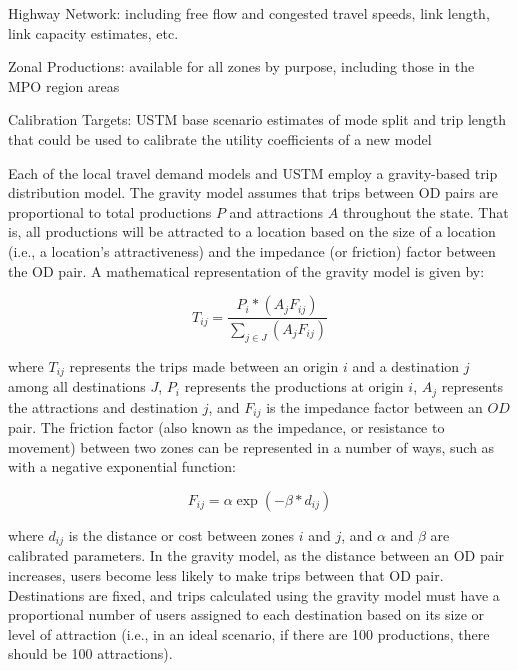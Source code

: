 \begin{description}
\def\labelenumi{\arabic{enumi}.}
\item
  {Highway Network}: including free flow and congested travel speeds,
  link length, link capacity estimates, etc.
\item
  {Zonal Productions}: available for all zones by purpose,
  including those in the MPO region areas
\item
  {Calibration Targets}: USTM base scenario estimates of mode split and
  trip length that could be used to calibrate the utility coefficients of a new model
\end{description}

Each of the local travel demand models and USTM employ a gravity-based trip
distribution model. The gravity model assumes that trips between OD
pairs are proportional to total productions $P$ and
attractions $A$ throughout the state. That is, all productions will be
attracted to a location based on the size of a location (i.e., a location's
attractiveness) and the impedance (or friction) factor between the OD
pair. A mathematical representation of the gravity model is given by:

\begin{equation}
T_{ij}= \frac{P_i*(A_j F_{ij})}{\sum_{j\in J}(A_j F_{ij})}
 \label{eqn:gravity}
\end{equation}

\noindent where $T_{ij}$ represents the trips made between an origin $i$ and a
  destination $j$ among all destinations $J$, $P_i$ represents the productions at origin $i$, $A_j$ represents the attractions and destination $j$, and $F_{ij}$ is the impedance factor between an $OD$ pair.
The friction factor (also known as the impedance, or resistance to movement) between two
zones can be represented in a number of ways, such as with a negative
exponential function:

\begin{equation}
	F_{ij} = \alpha \exp(-\beta * d_{ij})
  \label{eqn:fricfac}
\end{equation}

\noindent where $d_{ij}$ is the distance or cost between zones $i$ and $j$, and $\alpha$
and $\beta$ are calibrated parameters. In the gravity model, as the distance
between an OD pair increases, users become less likely to make trips between
that OD pair. Destinations are fixed, and trips calculated using the
gravity model must have a proportional number of users assigned to each
destination based on its size or level of attraction (i.e., in an ideal
scenario, if there are 100
productions, there should be 100 attractions).

